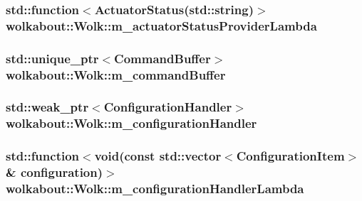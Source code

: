 \subsubsection[{\texorpdfstring{m\+\_\+actuator\+Status\+Provider\+Lambda}{m_actuatorStatusProviderLambda}}]{\setlength{\rightskip}{0pt plus 5cm}std\+::function$<$Actuator\+Status(std\+::string)$>$ wolkabout\+::\+Wolk\+::m\+\_\+actuator\+Status\+Provider\+Lambda\hspace{0.3cm}{\ttfamily [private]}}\hypertarget{classwolkabout_1_1_wolk_a357c76819475203ea44f0deceb82f3bf}{}\label{classwolkabout_1_1_wolk_a357c76819475203ea44f0deceb82f3bf}
\subsubsection[{\texorpdfstring{m\+\_\+command\+Buffer}{m_commandBuffer}}]{\setlength{\rightskip}{0pt plus 5cm}std\+::unique\+\_\+ptr$<$Command\+Buffer$>$ wolkabout\+::\+Wolk\+::m\+\_\+command\+Buffer\hspace{0.3cm}{\ttfamily [private]}}\hypertarget{classwolkabout_1_1_wolk_a84181505958620f03aa65303362c4103}{}\label{classwolkabout_1_1_wolk_a84181505958620f03aa65303362c4103}
\subsubsection[{\texorpdfstring{m\+\_\+configuration\+Handler}{m_configurationHandler}}]{\setlength{\rightskip}{0pt plus 5cm}std\+::weak\+\_\+ptr$<$Configuration\+Handler$>$ wolkabout\+::\+Wolk\+::m\+\_\+configuration\+Handler\hspace{0.3cm}{\ttfamily [private]}}\hypertarget{classwolkabout_1_1_wolk_a662b0a47eb325a676adaf7bdd07a9c4d}{}\label{classwolkabout_1_1_wolk_a662b0a47eb325a676adaf7bdd07a9c4d}
\subsubsection[{\texorpdfstring{m\+\_\+configuration\+Handler\+Lambda}{m_configurationHandlerLambda}}]{\setlength{\rightskip}{0pt plus 5cm}std\+::function$<$void(const std\+::vector$<$Configuration\+Item$>$\& configuration)$>$ wolkabout\+::\+Wolk\+::m\+\_\+configuration\+Handler\+Lambda\hspace{0.3cm}{\ttfamily [private]}}\hypertarget{classwolkabout_1_1_wolk_ae47e78eeb1e265a999014209d7bf15df}{}\label{classwolkabout_1_1_wolk_ae47e78eeb1e265a999014209d7bf15df}
